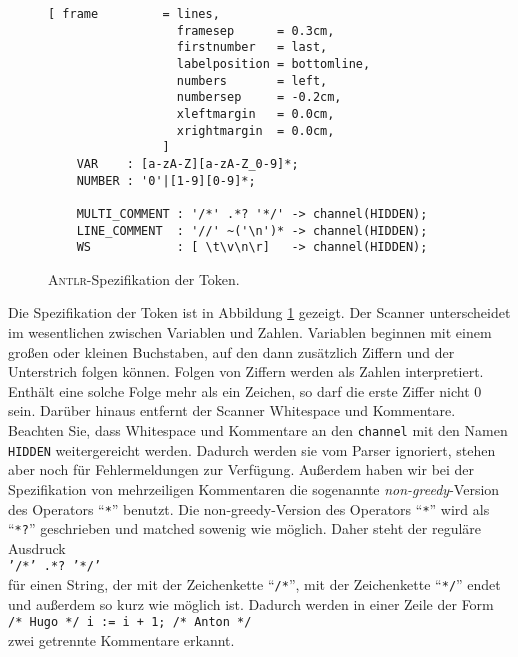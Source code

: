 \begin{figure}[!ht]
\centering
\begin{Verbatim}[ frame         = lines, 
                  framesep      = 0.3cm, 
                  firstnumber   = last,
                  labelposition = bottomline,
                  numbers       = left,
                  numbersep     = -0.2cm,
                  xleftmargin   = 0.0cm,
                  xrightmargin  = 0.0cm,
                ]
    VAR    : [a-zA-Z][a-zA-Z_0-9]*;
    NUMBER : '0'|[1-9][0-9]*;
    
    MULTI_COMMENT : '/*' .*? '*/' -> channel(HIDDEN);
    LINE_COMMENT  : '//' ~('\n')* -> channel(HIDDEN);
    WS            : [ \t\v\n\r]   -> channel(HIDDEN);
\end{Verbatim}
\vspace*{-0.3cm}
\caption{\textsc{Antlr}-Spezifikation der Token.}
\label{fig:Simple-2.g}
\end{figure}
Die Spezifikation der Token ist in Abbildung \ref{fig:Simple-2.g}
gezeigt.  Der Scanner unterscheidet im wesentlichen zwischen Variablen und Zahlen.
Variablen beginnen mit einem gro{\ss}en oder kleinen Buchstaben, auf den dann zus\"atzlich Ziffern und der
Unterstrich folgen k\"onnen.  Folgen von Ziffern werden als Zahlen interpretiert.  Enth\"alt eine solche
Folge mehr als ein Zeichen, so darf die erste Ziffer nicht 0 sein.  Dar\"uber hinaus entfernt der
Scanner Whitespace und Kommentare.  Beachten Sie, dass Whitespace und Kommentare an den
\texttt{channel}  mit den Namen \texttt{HIDDEN} weitergereicht werden.  Dadurch werden sie vom
Parser ignoriert, stehen aber noch f\"ur Fehlermeldungen zur Verf\"ugung.  Au{\ss}erdem haben wir bei der
Spezifikation von mehrzeiligen Kommentaren die sogenannte \emph{non-greedy}-Version des Operators
``\texttt{*}'' benutzt.  Die non-greedy-Version des Operators ``\texttt{*}'' wird als
``\texttt{*?}'' geschrieben und matched sowenig wie m\"oglich.  Daher steht der regul\"are Ausdruck
\\[0.2cm]
\hspace*{1.3cm}
\texttt{'/*' .*? '*/'}
\\[0.2cm]
f\"ur einen String, der mit der Zeichenkette ``\texttt{/*}'', mit der Zeichenkette ``\texttt{*/}''
endet und au{\ss}erdem so kurz wie m\"oglich ist.  Dadurch werden in einer Zeile der Form
\\[0.2cm]
\hspace*{1.3cm}
\texttt{/* Hugo */ i := i + 1; /* Anton */}
\\[0.2cm] 
zwei getrennte Kommentare erkannt.


